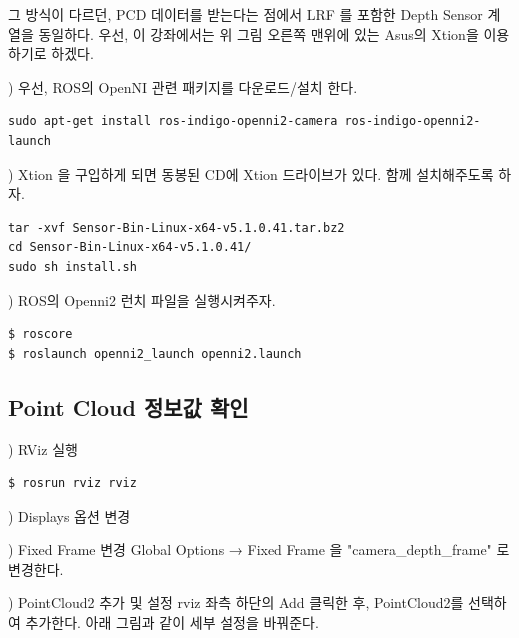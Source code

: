 그 방식이 다르던, PCD 데이터를 받는다는 점에서 LRF 를 포함한 Depth Sensor 계열을 동일하다. 우선, 이 강좌에서는 위 그림 오른쪽 맨위에 있는 Asus의 Xtion을 이용하기로 하겠다. 

\setcounter{num}{0}

\vspace{\baselineskip}
\noindent
{}
\thenum) 우선, ROS의 OpenNI 관련 패키지를 다운로드/설치 한다.

\begin{lstlisting}[language=ROS]
sudo apt-get install ros-indigo-openni2-camera ros-indigo-openni2-launch
\end{lstlisting}

\vspace{\baselineskip}
\noindent
{}
\thenum) Xtion 을 구입하게 되면 동봉된 CD에 Xtion 드라이브가 있다. 함께 설치해주도록 하자.

\begin{lstlisting}[language=ROS]
tar -xvf Sensor-Bin-Linux-x64-v5.1.0.41.tar.bz2
cd Sensor-Bin-Linux-x64-v5.1.0.41/
sudo sh install.sh 
\end{lstlisting}

\vspace{\baselineskip}
\noindent
{}
\thenum) ROS의 Openni2 런치 파일을 실행시켜주자.

\begin{lstlisting}[language=ROS]
$ roscore
$ roslaunch openni2_launch openni2.launch
\end{lstlisting}

\subsection{Point Cloud 정보값 확인}

\setcounter{num}{0}

\thenum) RViz 실행

\begin{lstlisting}[language=ROS]
$ rosrun rviz rviz
\end{lstlisting}

\noindent
{}
\thenum) Displays 옵션 변경

\vspace{\baselineskip}
\noindent
{}) Fixed Frame 변경
Global Options → Fixed Frame 을 "camera\_depth\_frame" 로 변경한다.

\vspace{\baselineskip}
\noindent
{}) PointCloud2 추가 및 설정
rviz 좌측 하단의 Add 클릭한 후, PointCloud2를 선택하여 추가한다. 아래 그림과 같이 세부 설정을 바꿔준다.

